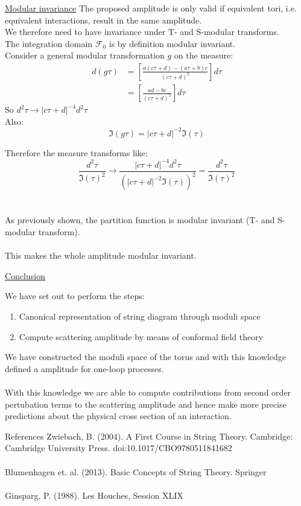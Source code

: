 \documentclass[11pt,aspectratio=169]{beamer}
\begin{document}
\begin{frame}{\underline{Modular invariance}}
	The proposed amplitude is only valid if equivalent tori, i.e. equivalent interactions, result in the same amplitude. 
	\\
	We therefore need to have invariance under T- and S-modular transforms.
	\\
	The integration domain $\mathcal{F}_0$ is by definition modular invariant. 
	\\
	Consider a general modular transformation $g$ on the measure:
	\begin{align*}
		d(g\tau) &=  [\frac{a(c\tau + d) - (a\tau + b)c}{(c\tau + d)^2}]d\tau \\
		&= [\frac{ad - bc}{(c\tau + d)^2}]d\tau
	\end{align*}
	So $d^2\tau \rightarrow |c\tau + d|^{-4}d^2\tau$
	\\
	Also: 
	\begin{equation}
		\Im(g\tau) = |c\tau + d|^{-2}\Im(\tau)
	\end{equation}
	
	
\end{frame}

\begin{frame}
	Therefore the measure transforms like:
	\begin{equation}
		\frac{d^2\tau}{\Im(\tau)^2} \rightarrow \frac{|c\tau + d|^{-4}d^2\tau}{(|c\tau + d|^{-2}\Im(\tau))^2} = \frac{d^2\tau}{\Im(\tau)^2}
	\end{equation}
	\\~\\
	As previously shown, the partition function is modular invariant (T- and S-modular transform). 
	\\~\\
	This makes the whole amplitude modular invariant.
\end{frame}

\begin{frame}{\underline{Conclusion}}

	We have set out to perform the steps:
	\begin{enumerate}
		\item Canonical representation of string diagram through moduli space
		\item Compute scattering amplitude by means of conformal field theory
	\end{enumerate}
	We have constructed the moduli space of the torus and with this knowledge defined a amplitude for one-loop processes.
	\\~\\
	With this knowledge we are able to compute contributions from second order pertubation terms to the scattering amplitude and hence make more precise predictions about the physical cross section of an interaction.

	
\end{frame}

\begin{frame}{References}
	Zwiebach, B. (2004). A First Course in String Theory. Cambridge: Cambridge University Press. doi:10.1017/CBO9780511841682
	\\~\\
	Blumenhagen et. al. (2013). Basic Concepts of String Theory. Springer
	\\~\\
	Ginsparg, P. (1988). Les Houches, Session XLIX
\end{frame}
\end{document}

